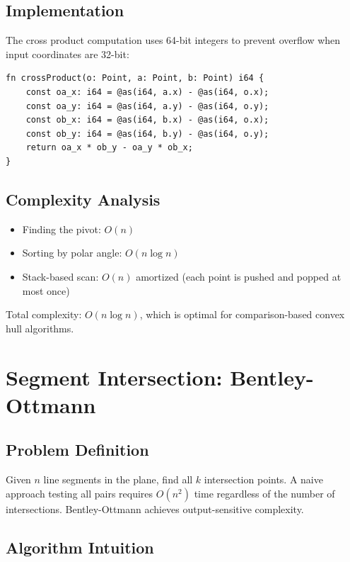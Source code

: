 \documentclass[11pt,a4paper]{article}
\begin{document}
\subsection{Implementation}

The cross product computation uses 64-bit integers to prevent overflow when input coordinates are 32-bit:

\begin{lstlisting}[caption={Cross product with overflow prevention}]
fn crossProduct(o: Point, a: Point, b: Point) i64 {
    const oa_x: i64 = @as(i64, a.x) - @as(i64, o.x);
    const oa_y: i64 = @as(i64, a.y) - @as(i64, o.y);
    const ob_x: i64 = @as(i64, b.x) - @as(i64, o.x);
    const ob_y: i64 = @as(i64, b.y) - @as(i64, o.y);
    return oa_x * ob_y - oa_y * ob_x;
}
\end{lstlisting}

\subsection{Complexity Analysis}

\begin{itemize}
    \item Finding the pivot: $O(n)$
    \item Sorting by polar angle: $O(n \log n)$
    \item Stack-based scan: $O(n)$ amortized (each point is pushed and popped at most once)
\end{itemize}

Total complexity: $O(n \log n)$, which is optimal for comparison-based convex hull algorithms.

\section{Segment Intersection: Bentley-Ottmann}

\subsection{Problem Definition}

Given $n$ line segments in the plane, find all $k$ intersection points. A naive approach testing all pairs requires $O(n^2)$ time regardless of the number of intersections. Bentley-Ottmann achieves output-sensitive complexity.

\subsection{Algorithm Intuition}
\end{document}

